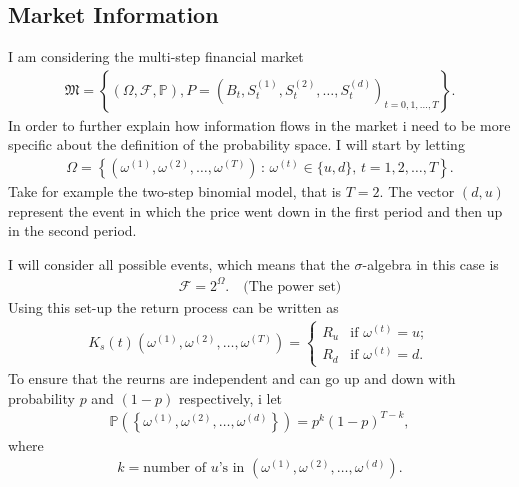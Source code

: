 \documentclass{article}
\theoremstyle{definition}
\numberwithin{equation}{section}
\begin{document}
\subsection{Market Information}
I am considering the multi-step financial market
\begin{align}
    \mathfrak{M} = \left\{
        (\Omega, \mathscr{F}, \mathbb{P}),
        P = \left(
            B_t, S_t^{(1)}, S_t^{(2)}, \ldots, S_t^{(d)}
        \right)_{t = 0,1, \ldots, T}
    \right\}.
\end{align}
In order to further explain how information flows in the market i need to be more specific about the definition of the probability space.
I will start by letting
\begin{align}
    \Omega = \left\{
        \left(
            \omega^{(1)}, \omega^{(2)}, \ldots, \omega^{(T)}
        \right)
        \, : \,
        \omega^{(t)} \in \{u,d\}, \, t = 1, 2, \ldots, T
    \right\}.
\end{align}
Take for example the two-step binomial model, that is $T = 2$.
The vector $(d,u)$ represent the event in which the price went down in the first period and then up in the second period.

I will consider all possible events, which means that the $\sigma$-algebra in this case is
\begin{align}
    \mathscr{F} = 2^{\Omega}. \quad \text{(The power set)}
\end{align}
Using this set-up the return process can be written as
\begin{align}
    K_s(t)(\omega^{(1)}, \omega^{(2)}, \ldots, \omega^{(T)}) =
    \begin{cases}
        R_u & \text{if } \omega^{(t)} = u; \\
        R_d & \text{if } \omega^{(t)} = d. 
    \end{cases}
\end{align}
To ensure that the reurns are independent and can go up and down with probability $p$ and $(1-p)$ respectively, i let
\begin{align}
    \mathbb{P}\left(
        \left\{
            \omega^{(1)}, \omega^{(2)}, \ldots, \omega^{(d)}
        \right\}
    \right) =
    p^k(1 - p)^{T-k},
\end{align}
where
\begin{align}
    k = \text{number of $u$'s in } \left(\omega^{(1)}, \omega^{(2)}, \ldots, \omega^{(d)}\right). 
\end{align}
\end{document}
